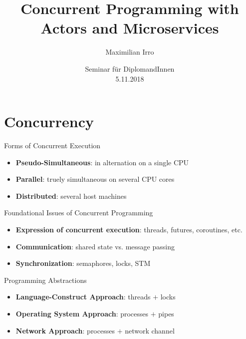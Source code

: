 \documentclass{beamer}
\title[Your Short Title]{Concurrent Programming with\\Actors and Microservices}
\author{Maximilian Irro}
\date{Seminar für DiplomandInnen\\5.11.2018}
\begin{document}
\begin{frame}
  \titlepage
\end{frame}



\section{Concurrency}



\begin{frame}{Forms of Concurrent Execution}

\begin{itemize}
  \pause
  \item \textbf{Pseudo-Simultaneous}: in alternation on a single CPU
  \pause
  \item \textbf{Parallel}: truely simultaneous on several CPU cores
  \pause
  \item \textbf{Distributed}: several host machines
\end{itemize}

\end{frame}


\begin{frame}{Foundational Issues of Concurrent Programming}

\begin{itemize}
  \pause
  \item \textbf{Expression of concurrent execution}: threads, futures, coroutines, etc.
  \pause
  \item \textbf{Communication}: shared state vs. message passing
  \pause
  \item \textbf{Synchronization}: semaphores, locks, STM
\end{itemize}

\end{frame}


\begin{frame}{Programming Abstractions}

\begin{itemize}
  \pause
  \item \textbf{Language-Construct Approach}: threads $+$ locks
  \pause
  \item \textbf{Operating System Approach}: processes $+$ pipes
  \pause
  \item \textbf{Network Approach}: processes $+$ network channel
\end{itemize}

\end{frame}
\end{document}
